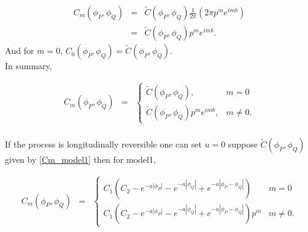 \begin{eqnarray*}
	C_m(\phi_P, \phi_Q)  &=& \tilde{C}(\phi_P, \phi_Q) \frac{1}{2\pi} (2\pi p^m e^{imb}) \\
	&=& \tilde{C}(\phi_P, \phi_Q) p^m e^{imb}.
\end{eqnarray*}
And for $m = 0$, $C_0(\phi_P, \phi_Q) = \tilde{C}(\phi_P, \phi_Q)$.\\

In summary,

\begin{eqnarray*}
	C_m(\phi_P, \phi_Q) &=& \left\{ \begin{array}{ll}
	\tilde{C}(\phi_P, \phi_Q), & m = 0 \\
	\tilde{C}(\phi_P, \phi_Q)p^m e^{imb}, & m \ne 0.
	\end{array}
	\right.\\
\end{eqnarray*}

If the process is longitudinally reversible one can set $u=0$ suppose $\tilde{C}(\phi_P, \phi_Q)$ given by \ref{Cm_model1} then \Cm for model1,

\begin{eqnarray*}
	C_m(\phi_P, \phi_Q) &=& \left\{ \begin{array}{ll}
	C_1\left(C_2 - e^{-a|\phi_P|} - e^{-a|\phi_Q|} + e^{-a|\phi_P - \phi_Q|}\right)  & m = 0 \\
	C_1\left(C_2 - e^{-a|\phi_P|} - e^{-a|\phi_Q|} + e^{-a|\phi_P - \phi_Q|}\right)p^m & m \ne 0.
	\end{array}
	\right.
\end{eqnarray*}




%
